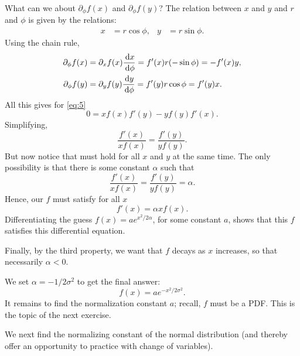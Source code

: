 \begin{exercise}
\begin{solution}
What can we about $\partial_{\phi} f(x)$ and $\partial_{\phi}f(y)$?
The relation between $x$ and $y$ and $r$ and $\phi$ is given by the relations:
\begin{align}
\label{eq:6}
x &= r \cos \phi, & y&=r\sin \phi.
\end{align}
Using the chain rule,
\begin{align}
  \label{eq:7}
  \partial_{\phi} f(x) &= \partial_{x} f(x) \frac{\,\textrm{d}x}{\,\textrm{d}\phi} = f'(x) r (-\sin \phi) = - f'(x) y, \\
  \partial_{\phi} f(y) &= \partial_{y} f(y) \frac{\,\textrm{d}y}{\,\textrm{d}\phi} = f'(y) r \cos \phi =  f'(y) x.
\end{align}
All this gives for \cref{eq:5}
\begin{equation}
\label{eq:8}
0 = x f(x) f'(y) - y f(y)f'(x).
\end{equation}
Simplifying,
\begin{equation}
  \label{eq:9}
   \frac{f'(x)}{x f(x)} = \frac{f'(y)}{ y f(y)}.
\end{equation}
But now notice that must hold for all $x$ and $y$ at the same time. The only possibility is that there is some constant $\alpha$ such that
\begin{equation}
\label{eq:10}
   \frac{f'(x)}{x f(x)} =  \frac{f'(y)}{y f(y)} = \alpha.
\end{equation}
Hence, our $f$ must satisfy for all $x$
\begin{equation}
\label{eq:11}
f'(x) = \alpha x f(x).
\end{equation}
Differentiating the guess $f(x) = a e^{ x^2/{2 \alpha}}$, for some constant $a$, shows that this $f$ satisfies this differential equation.

Finally, by the third property, we want that $f$ decays as $x$ increases, so that necessarily $\alpha<0$.


We set $\alpha = -1/2\sigma^{2}$ to get the final answer:
\begin{equation}
  \label{eq:12}
  f(x) = a e^{-x^{2}/2 \sigma^{2}}.
\end{equation}
It remains to find the normalization constant $a$; recall, $f$ must be a PDF. This is the topic of the next exercise.
\end{solution}
\end{exercise}

We next find the normalizing constant of the normal distribution (and thereby offer an opportunity to practice with change of variables).

